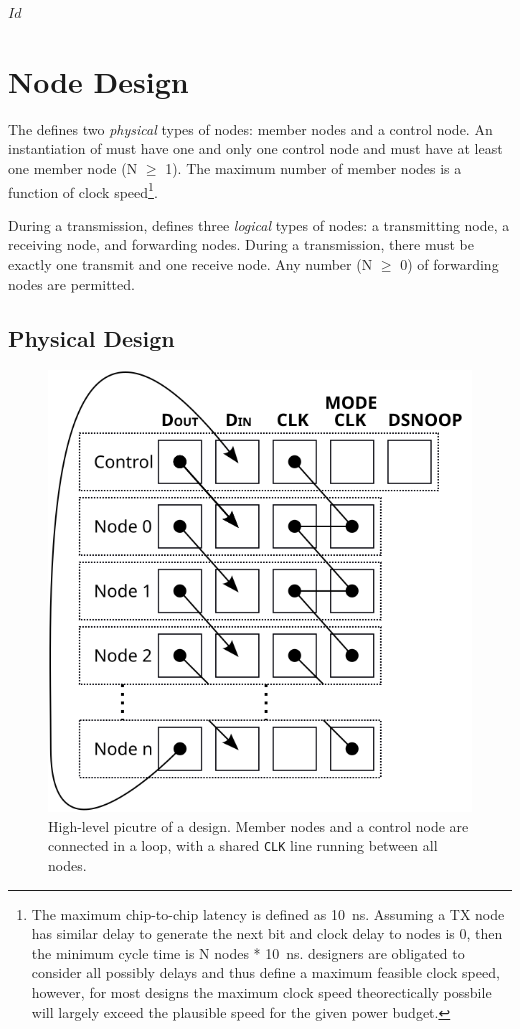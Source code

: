 \svnInfo $Id$

\section{Node Design}
\label{sec:node}
The \bus defines two {\em physical} types of nodes: member nodes and a control
node. An instantiation of \bus must have one and only one control node and
must have at least one member node (N $\geq$ 1). The maximum number of member
nodes is a function of clock speed\footnote{
  The maximum chip-to-chip latency is defined as 10~ns. Assuming a TX node has
similar delay to generate the next bit and clock delay to nodes is 0, then the
minimum cycle time is N nodes * 10~ns. \bus designers are obligated to
consider all possibly delays and thus define a maximum feasible clock speed,
however, for most designs the maximum clock speed theorectically possbile will
largely exceed the plausible speed for the given power budget.}.

During a transmission, \bus defines three {\em logical} types of nodes:
a transmitting node, a receiving node, and forwarding nodes. During a
transmission, there must be exactly one transmit and one receive node. Any
number (N $\geq$ 0) of forwarding nodes are permitted.

\subsection{Physical Design}
\label{sec:physical}

\begin{figure}
\begin{center}
\includegraphics[width=0.5\linewidth]{img/stacked_layers}
\end{center}
\caption{High-level picutre of a \bus design. Member nodes and a control node
are connected in a loop, with a shared {\tt CLK} line running between all
nodes.}
\label{fig:bus}
\end{figure}

